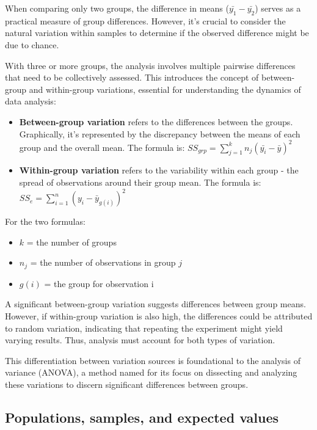 \documentclass{article}
\begin{document}
When comparing only two groups, the difference in means ($\bar{y_1}-\bar{y_2}$) serves as a practical measure of group differences. However, it's crucial to consider the natural variation within samples to determine if the observed difference might be due to chance.

With three or more groups, the analysis involves multiple pairwise differences that need to be collectively assessed. This introduces the concept of between-group and within-group variations, essential for understanding the dynamics of data analysis:

\begin{itemize}
    \item \textbf{Between-group variation} refers to the differences between the groups. Graphically, it's represented by the discrepancy between the means of each group and the overall mean. The formula is: ${SS}_{grp}=\sum_{j=1}^{k} n_j(\bar{y_i}-\bar{y})^2$

    \item \textbf{Within-group variation} refers to the variability within each group - the spread of observations around their group mean. The formula is: ${SS}_{e}=\sum_{i=1}^{n} (y_i-\bar{y}_{g(i)})^2$

\end{itemize}

For the two formulas:

\begin{itemize}
    \item \textbf{$k$} = the number of groups
    \item \textbf{$n_j$} = the number of observations in group $j$
    \item \textbf{$g(i)$} = the group for observation i
\end{itemize}


A significant between-group variation suggests differences between group means. However, if within-group variation is also high, the differences could be attributed to random variation, indicating that repeating the experiment might yield varying results. Thus, analysis must account for both types of variation.

This differentiation between variation sources is foundational to the analysis of variance (ANOVA), a method named for its focus on dissecting and analyzing these variations to discern significant differences between groups.

\subsection{Populations, samples, and expected values}
\end{document}
